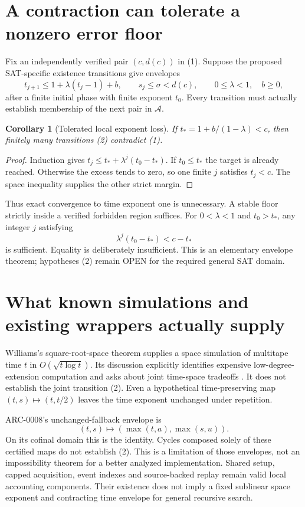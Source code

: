 \documentclass[11pt]{article}
\newtheorem{corollary}{Corollary}
\begin{document}
\section{A contraction can tolerate a nonzero error floor}
Fix an independently verified pair $(c,d(c))$ in (1). Suppose the proposed SAT-specific existence transitions give envelopes
\[
 t_{j+1}\le1+\lambda(t_j-1)+b,\qquad
 s_j\le\sigma<d(c),\qquad 0\le\lambda<1,\quad b\ge0,
 \tag{2}
\]
after a finite initial phase with finite exponent $t_0$. Every transition must actually establish membership of the next pair in $\mathcal A$.
\begin{corollary}[Tolerated local exponent loss]
If $t_*=1+b/(1-\lambda)<c$, then finitely many transitions (2) contradict (1).
\end{corollary}
\begin{proof}
Induction gives $t_j\le t_*+\lambda^j(t_0-t_*)$. If $t_0\le t_*$ the target is already reached. Otherwise the excess tends to zero, so one finite $j$ satisfies $t_j<c$. The space inequality supplies the other strict margin.
\end{proof}
Thus exact convergence to time exponent one is unnecessary. A stable floor strictly inside a verified forbidden region suffices. For $0<\lambda<1$ and $t_0>t_*$, any integer $j$ satisfying
\[
 \lambda^j(t_0-t_*)<c-t_*
\]
is sufficient. Equality is deliberately insufficient. This is an elementary envelope theorem; hypotheses (2) remain OPEN for the required general SAT domain.

\section{What known simulations and existing wrappers actually supply}
Williams's square-root-space theorem supplies a space simulation of multitape time $t$ in $O(\sqrt{t\log t})$. Its discussion explicitly identifies expensive low-degree-extension computation and asks about joint time-space tradeoffs \cite{williams}. It does not establish the joint transition (2). Even a hypothetical time-preserving map $(t,s)\mapsto(t,t/2)$ leaves the time exponent unchanged under repetition.

ARC-0008's unchanged-fallback envelope is
\[
 (t,s)\mapsto(\max(t,a),\max(s,u)).
\]
On its cofinal domain this is the identity. Cycles composed solely of these certified maps do not establish (2). This is a limitation of those envelopes, not an impossibility theorem for a better analyzed implementation. Shared setup, capped acquisition, event indexes and source-backed replay remain valid local accounting components. Their existence does not imply a fixed sublinear space exponent and contracting time envelope for general recursive search.
\end{document}
